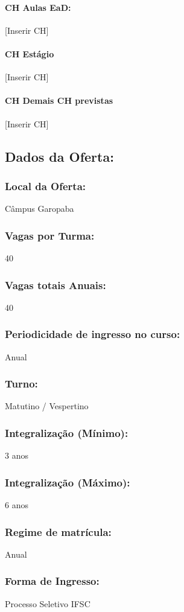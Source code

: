 \documentclass{../../modelos/latex-shared/ifsc-ppc}
\begin{document}
\paragraph{CH Aulas EaD:}
[Inserir CH]
\paragraph{CH Estágio}
[Inserir CH]
\paragraph{CH Demais CH previstas}
[Inserir CH]

\subsection{Dados da Oferta:}
\subsubsection{Local da Oferta:}
Câmpus Garopaba
\subsubsection{Vagas por Turma:}
40
\subsubsection{Vagas totais Anuais:}
40
\subsubsection{Periodicidade de ingresso no curso:}
Anual
\subsubsection{Turno:}
Matutino / Vespertino
\subsubsection{Integralização (Mínimo):}
3 anos
\subsubsection{Integralização (Máximo):}
6 anos
\subsubsection{Regime de matrícula:}
Anual
\subsubsection{Forma de Ingresso:}
Processo Seletivo IFSC
\end{document}
